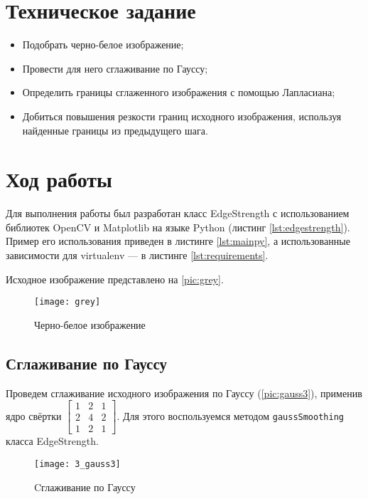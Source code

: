 \section{Техническое задание}

\begin{itemize}
	\item Подобрать черно-белое изображение;
	\item Провести для него сглаживание по Гауссу;
	\item Определить границы сглаженного изображения с помощью Лапласиана;
	\item Добиться повышения резкости границ исходного изображения, используя найденные границы из предыдущего шага.
\end{itemize}

\section{Ход работы}

Для выполнения работы был разработан класс EdgeStrength с использованием библиотек OpenCV и Matplotlib на языке Python (листинг \vref{lst:edgestrength}). Пример его использования приведен в листинге \cref{lst:mainpy}, а использованные зависимости для virtualenv --- в листинге \cref{lst:requirements}.

Исходное изображение представлено на \vref{pic:grey}.

\begin{figure}[H]
	\centering
	\texttt{[image: grey]}
	\caption{Черно-белое изображение}
	\label{pic:grey}
\end{figure}

\subsection{Сглаживание по Гауссу}

Проведем сглаживание исходного изображения по Гауссу (\vref{pic:gauss3}), применив ядро свёртки 
$\begin{bmatrix}
    1 & 2 & 1 \\
    2 & 4 & 2 \\
    1 & 2 & 1
\end{bmatrix}$. Для этого воспользуемся методом \texttt{gaussSmoothing} класса EdgeStrength.

\begin{figure}[H]
	\centering
	\texttt{[image: 3\_gauss3]}
	\caption{Cглаживание по Гауссу}
	\label{pic:gauss3}
\end{figure}


